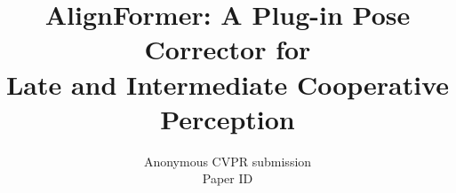 \documentclass[10pt,twocolumn,letterpaper]{article}
\title{AlignFormer: A Plug-in Pose Corrector for\\Late and Intermediate Cooperative Perception}
\author{Anonymous CVPR submission\\
Paper ID \paperID
}
\begin{document}
\maketitle
\sloppy













\clearpage
\oldbanner
\begingroup
\makeatletter{}\makeatother
\graphicspath{{old_draft/}}
\setcounter{section}{0}
\renewcommand{\theHsection}{old.\arabic{section}}








{
    \small
    
    
}

\endgroup
\end{document}
